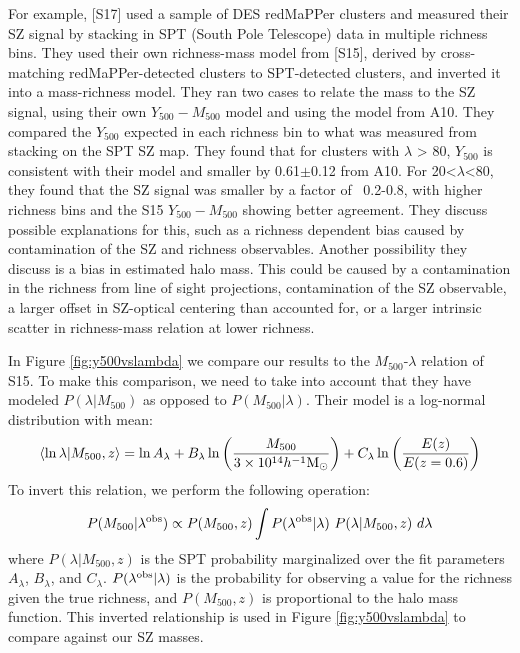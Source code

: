 \documentclass[a4paper,fleqn,usenatbib]{mnras}
\begin{document}
For example, \cite{2017MNRAS.468.3347S} [S17] used a sample of DES redMaPPer clusters and measured their SZ signal by stacking in SPT (South Pole Telescope) data in multiple richness bins.  
They used their own richness-mass model from \cite{2015MNRAS.454.2305S} [S15], derived by cross-matching redMaPPer-detected clusters to SPT-detected clusters, and inverted it into a mass-richness model.
They ran two cases to relate the mass to the SZ signal, using their own $Y_{500} - M_{500}$ model and using the model from A10. 
They compared the $Y_{500}$ expected in each richness bin to what was measured from stacking on the SPT SZ map. They found that for clusters with $\lambda$ > 80, $Y_{500}$ is consistent with their model and smaller by 0.61$\pm$0.12 from A10. 
For 20<$\lambda$<80, they found that the SZ signal was smaller by a factor of ~0.2-0.8, with higher richness bins and the S15 $Y_{500} - M_{500}$ showing better agreement. 
They discuss possible explanations for this, such as a richness dependent bias caused by contamination of the SZ and richness observables. 
Another possibility they discuss is a bias in estimated halo mass. This could be caused by a contamination in the richness from line of sight projections, contamination of the SZ observable, a larger offset in SZ-optical centering than accounted for, or a larger intrinsic scatter in richness-mass relation at lower richness.

In Figure \ref{fig:y500vslambda} we compare our results to the $M_{500}$-$\lambda$ relation of S15. 
To make this comparison, we need to take into account that they have modeled $P(\lambda|M_{500})$ as opposed to $P(M_{500}|\lambda)$. 
Their model is a log-normal distribution with mean:
\begin{equation}
\langle \ln\lambda | M_{500},z\rangle = \ln A_{\lambda} + B_{\lambda} \ln\bigg(\frac{M_{500}}{3 \times 10^{14}h^{-1}\rm M_{\odot}}\bigg) + C_{\lambda}\ln\bigg(\frac{E(z)}{E(z=0.6)}\bigg)
\end{equation}
To invert this relation, we perform the following operation:
\begin{equation}
P(M_{500}|\lambda^{\rm obs}) \propto P(M_{500},z) \int P(\lambda^{\rm obs}|\lambda) \  P(\lambda|M_{500},z) \ d\lambda
\end{equation}
where $P(\lambda|M_{500},z)$ is the SPT probability marginalized over the fit parameters $A_{\lambda}$, $B_{\lambda}$, and $C_{\lambda}$. 
$P(\lambda^{\rm obs}|\lambda)$ is the probability for observing a value for the richness given the true richness, and $P(M_{500},z)$ is proportional to the halo mass function. 
This inverted relationship is used in Figure \ref{fig:y500vslambda} to compare against our SZ masses.
\end{document}
